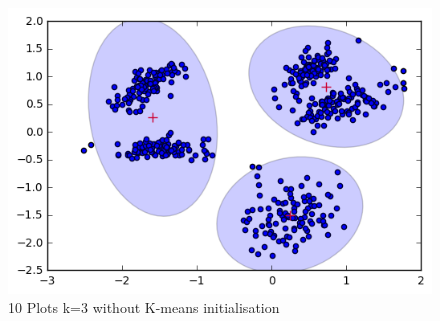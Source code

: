 \documentclass[a4paper,11pt]{article}
\begin{document}
\begin{figure}[htbp]
  \includegraphics[scale=0.2]{k3nk10.png}
  \caption{10 Plots k=3 without K-means initialisation }
\end{figure}
\end{document}
